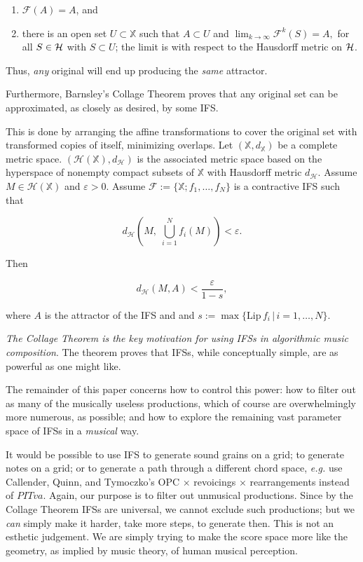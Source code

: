 \documentclass[english,11pt,letterpaper,onecolumn]{scrartcl}
\numberwithin{equation}{section}
\newcommand{\st}{\,|\,}
\newcommand{\X}{\mathbb{X}}
\newcommand{\cF}{\mathcal{F}}
\newcommand{\calH}{\mathcal{H}}
\begin{document}
\begin{enumerate}
\item $\cF(A)=A$, and
\item there is an open set $U\subset \X$ such that $A\subset U$ and
$\lim_{k\rightarrow\infty}\mathcal{F}^{k}(S)=A,$ for all $S\in \cal{H}$ with 
$S\subset U$; the limit is with respect to the Hausdorff metric on $\cal{H}$.
\end{enumerate}

\noindent Thus, \textit{any} original will end up producing the 
\textit{same} attractor. 

Furthermore, Barnsley's Collage Theorem \cite{barnsley:1986:solution} proves 
that any original set can be approximated, as closely as desired, by some IFS. 

This is done by arranging the affine transformations to cover the original set 
with transformed copies of itself, minimizing overlaps. Let 
$(\mathbb{X},d_\mathbb{X})$ be a complete metric space. $(\calH (\X), 
d_\calH)$ 
is the associated metric space based on the hyperspace of nonempty compact 
subsets of $\X$ with Hausdorff metric $d_\calH$. Assume $M\in\calH(\X)$ and 
$\varepsilon > 0$. Assume $\cF := \{\X; f_1, \ldots, f_N\}$ is a contractive 
IFS such that

\[
d_\calH \left(M, \;\bigcup_{i=1}^N f_i (M) \right) < \varepsilon.
\]

\noindent Then

\[
d_\calH (M, A) < \frac{\varepsilon}{1-s},
\]

\noindent where $A$ is the attractor of the IFS and  and $s := 
\max\{\mathrm{Lip}\,f_i\st 
i = 1, \ldots, N\}$.

\textit{The Collage Theorem is the key motivation for using IFSs in 
algorithmic music composition}. The theorem proves that IFSs, while 
conceptually simple, are as powerful as one might like. 

The remainder of this paper concerns how to control this power: how to 
filter out as many of the musically useless productions, which of course are 
overwhelmingly more numerous, as possible; and how to explore the 
remaining vast parameter space of IFSs in a \textit{musical} way.

It would be possible to use IFS to generate sound grains on a grid; to 
generate notes on a grid; or to generate a path through a different chord 
space, \textit{e.g.} use Callender, Quinn, and Tymoczko's OPC $\times$ 
revoicings $\times$ rearrangements instead of $PITva$. Again, our purpose is 
to filter out unmusical productions. Since by the Collage Theorem IFSs are 
universal, we cannot exclude such productions; but we \textit{can} simply make 
it harder, take more steps, to generate then. This is not an esthetic 
judgement. We are simply trying to make the score space more like the 
geometry, as implied by music theory, of human musical perception.
\end{document}
